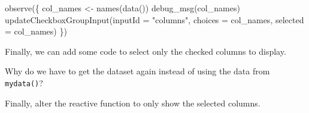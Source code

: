 \documentclass[
]{book}
\newenvironment{Shaded}{\begin{snugshade}}{\end{snugshade}}
\newcommand{\AttributeTok}[1]{\textcolor[rgb]{0.77,0.63,0.00}{#1}}
\newcommand{\ConstantTok}[1]{\textcolor[rgb]{0.00,0.00,0.00}{#1}}
\newcommand{\ControlFlowTok}[1]{\textcolor[rgb]{0.13,0.29,0.53}{\textbf{#1}}}
\newcommand{\FunctionTok}[1]{\textcolor[rgb]{0.00,0.00,0.00}{#1}}
\newcommand{\NormalTok}[1]{#1}
\newcommand{\OtherTok}[1]{\textcolor[rgb]{0.56,0.35,0.01}{#1}}
\newcommand{\SpecialCharTok}[1]{\textcolor[rgb]{0.00,0.00,0.00}{#1}}
\newcommand{\StringTok}[1]{\textcolor[rgb]{0.31,0.60,0.02}{#1}}
\begin{document}
\begin{Shaded}
\begin{Highlighting}[]
\FunctionTok{observe}\NormalTok{(\{}
\NormalTok{  col\_names }\OtherTok{\textless{}{-}} \FunctionTok{names}\NormalTok{(}\FunctionTok{data}\NormalTok{())}
  \FunctionTok{debug\_msg}\NormalTok{(col\_names)}
  \FunctionTok{updateCheckboxGroupInput}\NormalTok{(}\AttributeTok{inputId =} \StringTok{"columns"}\NormalTok{,}
                           \AttributeTok{choices =}\NormalTok{ col\_names,}
                           \AttributeTok{selected =}\NormalTok{ col\_names)}
\NormalTok{\})}
\end{Highlighting}
\end{Shaded}

Finally, we can add some code to select only the checked columns to display.

\begin{Shaded}
\end{Shaded}

Why do we have to get the dataset again instead of using the data from \texttt{mydata()}?

Finally, alter the reactive function to only show the selected columns.

\begin{Shaded}
\end{Shaded}
\end{document}
